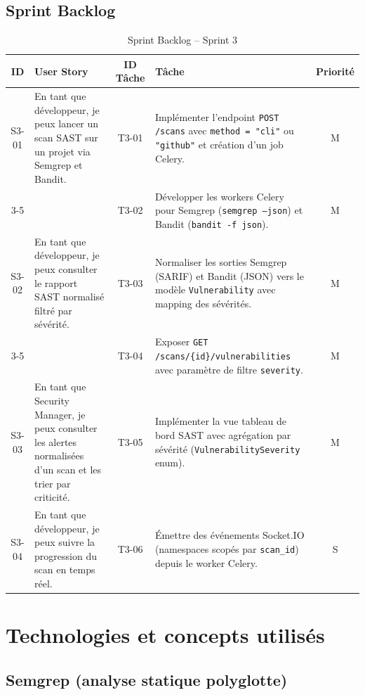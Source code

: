 \subsection{Sprint Backlog}
\begin{table}[H]
\centering
\caption{Sprint Backlog -- Sprint 3}
\label{tab:sprint3-backlog}
\small
\renewcommand{\arraystretch}{1.3}
\begin{tabularx}{\textwidth}{c X c X c}
\hline
\rowcolor{gray!15}
\textbf{ID} & \textbf{User Story} & \textbf{ID Tâche} & \textbf{Tâche} & \textbf{Priorité} \\
\hline
S3-01 & En tant que développeur, je peux lancer un scan SAST sur un projet via Semgrep et Bandit.
  & T3-01 & Implémenter l'endpoint \texttt{POST /scans} avec \texttt{method = "cli"} ou \texttt{"github"} et création d'un job Celery. & M \\
\cline{3-5}
  & & T3-02 & Développer les workers Celery pour Semgrep (\texttt{semgrep --json}) et Bandit (\texttt{bandit -f json}). & M \\
\hline
S3-02 & En tant que développeur, je peux consulter le rapport SAST normalisé filtré par sévérité.
  & T3-03 & Normaliser les sorties Semgrep (SARIF) et Bandit (JSON) vers le modèle \texttt{Vulnerability} avec mapping des sévérités. & M \\
\cline{3-5}
  & & T3-04 & Exposer \texttt{GET /scans/\{id\}/vulnerabilities} avec paramètre de filtre \texttt{severity}. & M \\
\hline
S3-03 & En tant que Security Manager, je peux consulter les alertes normalisées d'un scan et les trier par criticité.
  & T3-05 & Implémenter la vue tableau de bord SAST avec agrégation par sévérité (\texttt{VulnerabilitySeverity} enum). & M \\
\hline
S3-04 & En tant que développeur, je peux suivre la progression du scan en temps réel.
  & T3-06 & Émettre des événements Socket.IO (namespaces scopés par \texttt{scan\_id}) depuis le worker Celery. & S \\
\hline
\end{tabularx}
\end{table}

\section{Technologies et concepts utilisés}

\subsection{Semgrep (analyse statique polyglotte)}

